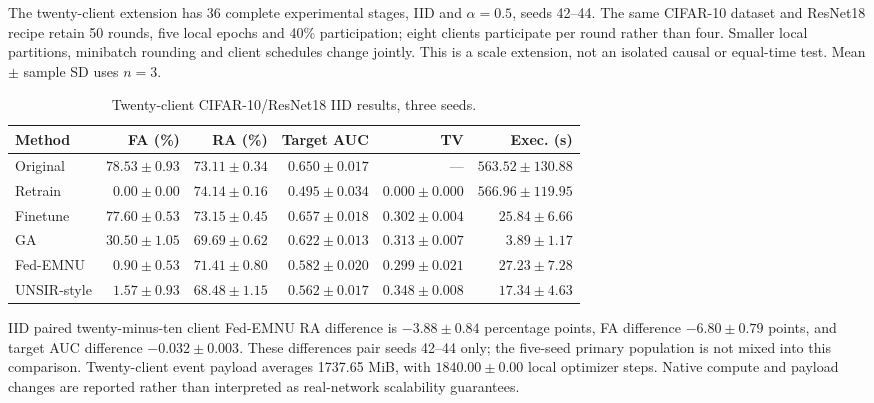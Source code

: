 \documentclass[software,article,submit,moreauthors]{Definitions/mdpi}
\begin{document}
The twenty-client extension has 36 complete experimental stages, IID and $\alpha=0.5$, seeds 42--44. The same CIFAR-10 dataset and ResNet18 recipe retain 50 rounds, five local epochs and 40\% participation; eight clients participate per round rather than four. Smaller local partitions, minibatch rounding and client schedules change jointly. This is a scale extension, not an isolated causal or equal-time test. Mean $\pm$ sample SD uses $n=3$.

\begin{table}[H]
\caption{Twenty-client CIFAR-10/ResNet18 IID results, three seeds.}
\label{tab:clients20-iid}
\centering\footnotesize\setlength{\tabcolsep}{3.5pt}
\begin{tabular}{lrrrrr}
\toprule
Method & FA (\%) & RA (\%) & Target AUC & TV & Exec. (s)\\
\midrule
Original & $78.53 \pm 0.93$ & $73.11 \pm 0.34$ & $0.650 \pm 0.017$ & --- & $563.52 \pm 130.88$\\
Retrain & $0.00 \pm 0.00$ & $74.14 \pm 0.16$ & $0.495 \pm 0.034$ & $0.000 \pm 0.000$ & $566.96 \pm 119.95$\\
Finetune & $77.60 \pm 0.53$ & $73.15 \pm 0.45$ & $0.657 \pm 0.018$ & $0.302 \pm 0.004$ & $25.84 \pm 6.66$\\
GA & $30.50 \pm 1.05$ & $69.69 \pm 0.62$ & $0.622 \pm 0.013$ & $0.313 \pm 0.007$ & $3.89 \pm 1.17$\\
Fed-EMNU & $0.90 \pm 0.53$ & $71.41 \pm 0.80$ & $0.582 \pm 0.020$ & $0.299 \pm 0.021$ & $27.23 \pm 7.28$\\
UNSIR-style & $1.57 \pm 0.93$ & $68.48 \pm 1.15$ & $0.562 \pm 0.017$ & $0.348 \pm 0.008$ & $17.34 \pm 4.63$\\
\bottomrule
\end{tabular}
\end{table}

IID paired twenty-minus-ten client Fed-EMNU RA difference is $-3.88 \pm 0.84$ percentage points, FA difference $-6.80 \pm 0.79$ points, and target AUC difference $-0.032 \pm 0.003$. These differences pair seeds 42--44 only; the five-seed primary population is not mixed into this comparison. Twenty-client event payload averages 1737.65 MiB, with $1840.00 \pm 0.00$ local optimizer steps. Native compute and payload changes are reported rather than interpreted as real-network scalability guarantees.
\end{document}
